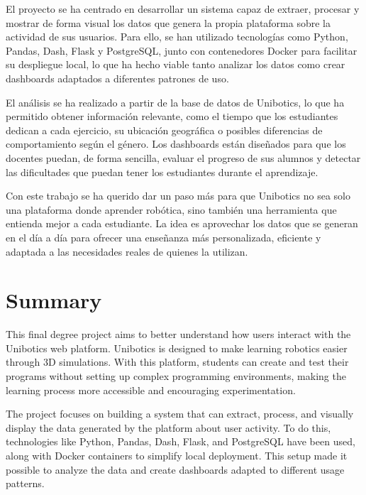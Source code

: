 \documentclass[a4paper, 12pt]{book}
\begin{document}
El proyecto se ha centrado en desarrollar un sistema capaz de extraer, procesar y mostrar de forma visual los datos que genera la propia plataforma sobre la actividad de sus usuarios. Para ello, se han utilizado tecnologías como Python, Pandas, Dash, Flask y PostgreSQL, junto con contenedores Docker para facilitar su despliegue local, lo que ha hecho viable tanto analizar los datos como crear dashboards adaptados a diferentes patrones de uso.

El análisis se ha realizado a partir de la base de datos de Unibotics, lo que ha permitido obtener información relevante, como el tiempo que los estudiantes dedican a cada ejercicio, su ubicación geográfica o posibles diferencias de comportamiento según el género. Los dashboards están diseñados para que los docentes puedan, de forma sencilla, evaluar el progreso de sus alumnos y detectar las dificultades que puedan tener los estudiantes durante el aprendizaje.

Con este trabajo se ha querido dar un paso más para que Unibotics no sea solo una plataforma donde aprender robótica, sino también una herramienta que entienda mejor a cada estudiante. La idea es aprovechar los datos que se generan en el día a día para ofrecer una enseñanza más personalizada, eficiente y adaptada a las necesidades reales de quienes la utilizan.


\chapter*{Summary}

This final degree project aims to better understand how users interact with the Unibotics web platform. Unibotics is designed to make learning robotics easier through 3D simulations. With this platform, students can create and test their programs without setting up complex programming environments, making the learning process more accessible and encouraging experimentation.

The project focuses on building a system that can extract, process, and visually display the data generated by the platform about user activity. To do this, technologies like Python, Pandas, Dash, Flask, and PostgreSQL have been used, along with Docker containers to simplify local deployment. This setup made it possible to analyze the data and create dashboards adapted to different usage patterns.
\end{document}
